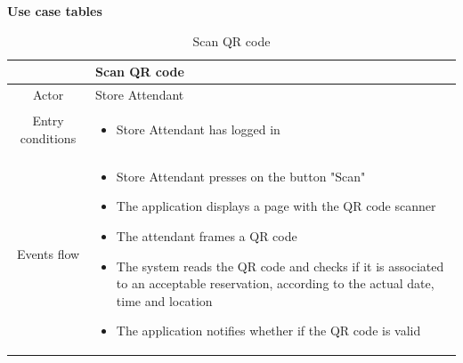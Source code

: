 \documentclass[table, 12pt]{article}
\begin{document}
\begin{minipage}{\textwidth}
    \textbf{Use case tables}\\

    \begin{longtable}{|c| p{10cm}|}
        \caption{Scan QR code}                                                                                                                                                                                                                                                                \\
        \hline
                         & Scan QR code                                                                                                                                                                                                                                                       \\
        \hline
        Actor            & Store Attendant                                                                                                                                                                                                                                                    \\
        \hline
        Entry conditions & \begin{itemize}
            \item Store Attendant has logged in
        \end{itemize}                                                                                                                                                                                                                                         \\
        \hline
        Events flow      & \begin{itemize}[nosep,after=\strut]
            \item Store Attendant presses on the button "Scan"
            \item The application displays a page with the QR code scanner
            \item The attendant frames a QR code
            \item The system reads the QR code and checks if it is associated to an acceptable reservation, according to the actual date, time and location
            \item The application notifies whether if the QR code is valid
        \end{itemize}                                                                                                                                                                                                                                         \\

\end{longtable}
\end{minipage}
\end{document}
